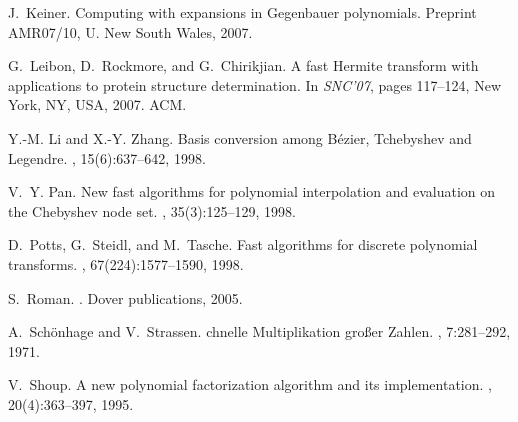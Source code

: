 \documentclass{sig-alternate}
\begin{document}
\begin{thebibliography}{10}
J.~Keiner.
\newblock Computing with expansions in {G}egenbauer polynomials.
\newblock Preprint AMR07/10, U. New South Wales, 2007.

G.~Leibon, D.~Rockmore, and G.~Chirikjian.
\newblock A fast {H}ermite transform with applications to protein structure
  determination.
\newblock In {\em SNC'07}, pages 117--124, New York, NY, USA, 2007. ACM.

Y.-M. Li and X.-Y. Zhang.
\newblock Basis conversion among {B}\'ezier, {T}chebyshev and {L}egendre.
, 15(6):637--642, 1998.

V.~Y. Pan.
\newblock New fast algorithms for polynomial interpolation and evaluation on
  the {C}hebyshev node set.
, 35(3):125--129,
  1998.

D.~Potts, G.~Steidl, and M.~Tasche.
\newblock Fast algorithms for discrete polynomial transforms.
, 67(224):1577--1590, 1998.

S.~Roman.
.
\newblock Dover publications, 2005.

A.~Sch{\"o}nhage and V.~Strassen.
chnelle {M}ultiplikation gro\ss er {Z}ahlen.
, 7:281--292, 1971.

V.~Shoup.
\newblock A new polynomial factorization algorithm and its implementation.
, 20(4):363--397, 1995.

\end{thebibliography}
\end{document}
